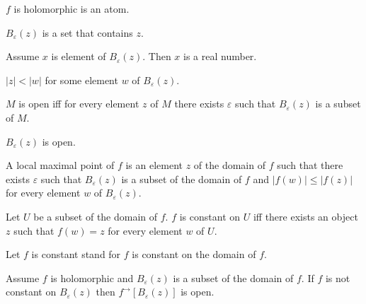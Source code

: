 \documentclass{article}
\newcommand{\Ball}[2]{B_{#1}(#2)}
\newcommand{\image}[2]{#1^{\to}[#2]}
\begin{document}
  \begin{forthel}
    \begin{signature}
      $f$ is holomorphic is an atom.
    \end{signature}

    \begin{signature}
      $\Ball{\varepsilon}{z}$ is a set that contains $z$.
    \end{signature}

    \begin{axiom}
      Assume $x$ is element of $\Ball{\varepsilon}{z}$. Then $x$ is a real number.
    \end{axiom}

    \begin{axiom}
      $|z| < |w|$ for some element $w$ of $\Ball{\varepsilon}{z}$.
    \end{axiom}

    \begin{definition}
      $M$ is open iff for every element $z$ of $M$ there exists $\varepsilon$ such that
        $\Ball{\varepsilon}{z}$ is a subset of $M$.
    \end{definition}

    \begin{axiom}
      $\Ball{\varepsilon}{z}$ is open.
    \end{axiom}

    \begin{definition}
      A local maximal point of $f$ is an element $z$ of the domain of $f$ such that there exists $\varepsilon$ such that $\Ball{\varepsilon}{z}$ is a subset of the domain of $f$ and $|f(w)| \leq |f(z)|$ for every element $w$ of $\Ball{\varepsilon}{z}$.
    \end{definition}

    \begin{definition}
      Let $U$ be a subset of the domain of $f$.
      $f$ is constant on $U$ iff there exists an object $z$ such that $f(w) = z$ for every element $w$ of $U$.
    \end{definition}

    Let $f$ is constant stand for $f$ is constant on the domain of $f$.

    \begin{axiom}
      Assume $f$ is holomorphic and $\Ball{\varepsilon}{z}$ is a subset of the domain of $f$.
      If $f$ is not constant on $\Ball{\varepsilon}{z}$
        then $\image{f}{\Ball{\varepsilon}{z}}$ is open.
    \end{axiom}
  \end{forthel}
\end{document}
